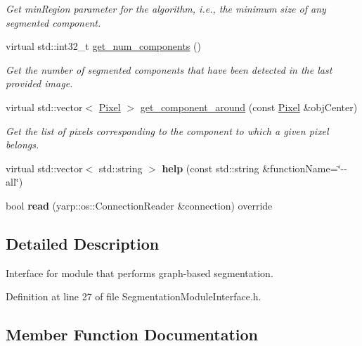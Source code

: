 \begin{DoxyCompactItemize}
\begin{DoxyCompactList}\small\item\em Get min\+Region parameter for the algorithm, i.\+e., the minimum size of any segmented component. \end{DoxyCompactList}\item 
virtual std\+::int32\+\_\+t \hyperlink{classyarp_1_1sig_1_1SegmentationModuleInterface_a253cb5a4d4250b97842537b664a93064}{get\+\_\+num\+\_\+components} ()
\begin{DoxyCompactList}\small\item\em Get the number of segmented components that have been detected in the last provided image. \end{DoxyCompactList}\item 
virtual std\+::vector$<$ \hyperlink{classyarp_1_1sig_1_1Pixel}{Pixel} $>$ \hyperlink{classyarp_1_1sig_1_1SegmentationModuleInterface_a9bf0b95fbab216b2284122b0b8a36820}{get\+\_\+component\+\_\+around} (const \hyperlink{classyarp_1_1sig_1_1Pixel}{Pixel} \&obj\+Center)
\begin{DoxyCompactList}\small\item\em Get the list of pixels corresponding to the component to which a given pixel belongs. \end{DoxyCompactList}\item 
\mbox{\label{classyarp_1_1sig_1_1SegmentationModuleInterface_a14ea1dff9efc91a5099633740b3e45f9}} 
virtual std\+::vector$<$ std\+::string $>$ {\bfseries help} (const std\+::string \&function\+Name=\char`\"{}-\/-\/all\char`\"{})
\item 
\mbox{\label{classyarp_1_1sig_1_1SegmentationModuleInterface_a31d3ce62c3ad4ab669216a19cde4e769}} 
bool {\bfseries read} (yarp\+::os\+::\+Connection\+Reader \&connection) override
\end{DoxyCompactItemize}


\subsection{Detailed Description}
Interface for module that performs graph-\/based segmentation. 

Definition at line 27 of file Segmentation\+Module\+Interface.\+h.



\subsection{Member Function Documentation}
\mbox{\label{classyarp_1_1sig_1_1SegmentationModuleInterface_a9bf0b95fbab216b2284122b0b8a36820}} 
